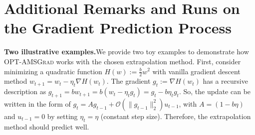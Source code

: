 \documentclass[twoside]{article}
\begin{document}
\vspace{0.2in}

\section{Additional Remarks and Runs on the Gradient Prediction Process}


\textbf{Two illustrative examples.}\hspace{0.1in}We provide two toy examples to demonstrate how \textsc{OPT-AMSGrad} works with the chosen extrapolation method. First, consider minimizing a quadratic function $H(w) := \frac{b}{2} w^2 $  
with vanilla gradient descent method $w_{t+1} = w_t - \eta_t \nabla H(w_t)$. 
The gradient $g_{t}:= \nabla H(w_{t})$ has a recursive description as  $g_{t+1} = b w_{t+1} = b ( w_t  - \eta_t g_t ) = g_t - b \eta_t g_t  $.
So, the update can be written in the form of $g_t = A g_{t-1}  + \mathcal{O}( \| g_{t-1} \|_2^2 ) u_{t-1}$, with $A = (1 - b \eta)$ and $u_{t-1}=0$ by setting $\eta_t=\eta$ (constant step size).
Therefore, the extrapolation method should predict well.
\end{document}
